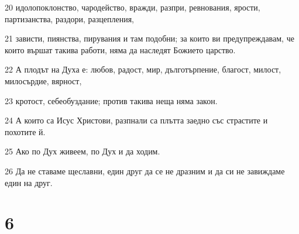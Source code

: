 \par 20 идолопоклонство, чародейство, вражди, разпри, ревнования, ярости, партизанства, раздори, разцепления,
\par 21 зависти, пиянства, пирувания и там подобни; за които ви предупреждавам, че които вършат такива работи, няма да наследят Божието царство.
\par 22 А плодът на Духа е: любов, радост, мир, дълготърпение, благост, милост, милосърдие, вярност,
\par 23 кротост, себеобуздание; против такива неща няма закон.
\par 24 А които са Исус Христови, разпнали са плътта заедно със страстите и похотите й.
\par 25 Ако по Дух живеем, по Дух и да ходим.
\par 26 Да не ставаме щеславни, един друг да се не дразним и да си не завиждаме един на друг.

\chapter{6}

